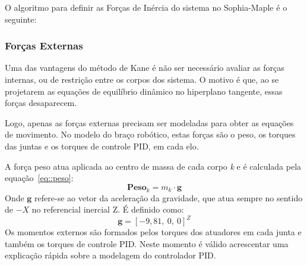 O algoritmo para definir as Forças de Inércia do sistema no Sophia-Maple é o
seguinte:

\bigskip {}

\medskip {}

\medskip {}

\medskip {}


\subsubsection{Forças Externas}

Uma das vantagens do método de Kane é não ser necessário avaliar as forças
internas, ou de restrição entre os corpos dos sistema. O motivo é que, ao se
projetarem as equações de equilíbrio dinâmico no hiperplano tangente, essas
forças desaparecem.

Logo, apenas as forças externas precisam ser modeladas para obter as equações de
movimento. No modelo do braço robótico, estas forças são o peso, os torques das
juntas e os torques de controle PID, em cada elo.

A força peso atua aplicada ao centro de massa de cada corpo \textit{k} e é calculada
pela equação~\ref{eq::peso}:
%
\begin{equation}
	\mathbf{Peso}_{k} = m_{k} \cdot \mathbf{g} \label{eq::peso}
\end{equation}
%
Onde $\mathbf{g}$ refere-se ao vetor da aceleração da gravidade, que atua sempre
no sentido de $-X$ no referencial inercial Z. É definido como:
%
\begin{equation}
	\mathbf{g} = [-9,81,~0,~0]^{Z}
\end{equation}
%
Os momentos externos são formados pelos torques dos atuadores em cada junta e
também os torques de controle PID. Neste momento é válido acrescentar uma
explicação rápida sobre a modelagem do controlador PID.

